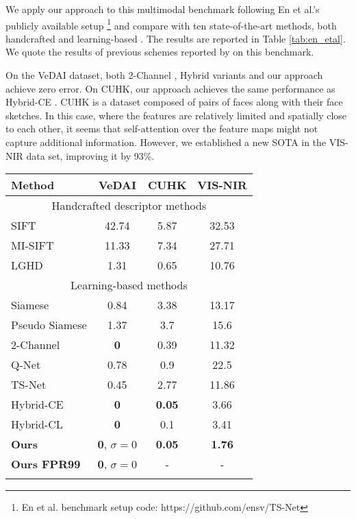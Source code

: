 \documentclass[10pt,journal]{IEEEtran}\usepackage{amsfonts}
\begin{document}
We apply our approach to this multimodal benchmark following En et al.'s
\cite{TS-net} publicly available setup \footnote{En et al. benchmark setup code: https://github.com/ensv/TS-Net} and compare
with ten state-of-the-art methods, both handcrafted \cite{SIFT, MI_SIFT,
LGHD} and learning-based \cite{SiameseCrossSpectral, Q-net, TS-net,
multisensor}. The results are reported in Table \ref{tab:en_etal}. We quote
the results of previous schemes reported by \cite{TS-net, multisensor} on
this benchmark.

On the VeDAI dataset, both 2-Channel \cite{SiameseCrossSpectral}, Hybrid
\cite{multisensor} variants and our approach achieve zero error. On CUHK,
our approach achieves the same performance as Hybrid-CE \cite{multisensor}.
CUHK is a dataset composed of pairs of faces along with their face sketches.
In this case, where the features are relatively limited and spatially close
to each other, it seems that self-attention over the feature maps might not
capture additional information. However, we established a new SOTA in the
VIS-NIR data set, improving it by 93\%.
\begin{table*}[tbh]
\centering
\par
\begin{tabular}{lccc}
\toprule Method & VeDAI & CUHK & VIS-NIR \\
\midrule
\multicolumn{4}{c}{Handcrafted descriptor methods} \\
SIFT\cite{SIFT} & 42.74 & 5.87 & 32.53 \\
MI-SIFT \cite{MI_SIFT} & 11.33 & 7.34 & 27.71 \\
LGHD\cite{LGHD} & 1.31 & 0.65 & 10.76 \\
\midrule
\multicolumn{4}{c}{Learning-based methods} \\
Siamese\cite{SiameseCrossSpectral} & 0.84 & 3.38 & 13.17 \\
Pseudo Siamese\cite{SiameseCrossSpectral} & 1.37 & 3.7 & 15.6 \\
2-Channel\cite{SiameseCrossSpectral} & \textbf{0} & 0.39 & 11.32 \\
Q-Net\cite{Q-net} & 0.78 & 0.9 & 22.5 \\
TS-Net\cite{TS-net} & 0.45 & 2.77 & 11.86 \\
Hybrid-CE \cite{multisensor} & \textbf{0} & \textbf{0.05} & 3.66 \\
Hybrid-CL \cite{multisensor} & \textbf{0} & 0.1 & 3.41 \\
\textbf{Ours} & \multicolumn{1}{l}{\textbf{0}, $\sigma =0$} & \textbf{0.05}
& \textbf{1.76} \\
\textbf{Ours FPR99} & \multicolumn{1}{l}{\textbf{0}, $\sigma =0$} & - & - \\
\bottomrule &  &  &
\end{tabular}\caption{Patch matching results evaluated on En et al. Benchmark
\protect\cite{TS-net} consisting of three multimodal datasets sampled on a
uniform grid layout. The score is given in terms of FPR95. On the VeDAI
dataset, we performed a stricter evaluation using FPR99 and reported the
standard deviation out of 10 tests.}
\label{tab:en_etal}
\end{table*}
\end{document}
